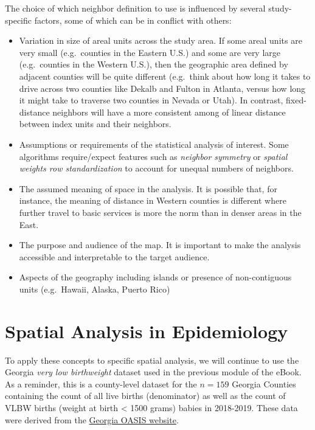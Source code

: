 \documentclass[
]{book}
\providecommand{\tightlist}{%
  \setlength{\itemsep}{0pt}\setlength{\parskip}{0pt}}
\begin{document}
The choice of which neighbor definition to use is influenced by several study-specific factors, some of which can be in conflict with others:

\begin{itemize}
\tightlist
\item
  Variation in size of areal units across the study area. If some areal units are very small (e.g.~counties in the Eastern U.S.) and some are very large (e.g.~counties in the Western U.S.), then the geographic area defined by adjacent counties will be quite different (e.g.~think about how long it takes to drive across two counties like Dekalb and Fulton in Atlanta, versus how long it might take to traverse two counties in Nevada or Utah). In contrast, fixed-distance neighbors will have a more consistent among of linear distance between index units and their neighbors.
\item
  Assumptions or requirements of the statistical analysis of interest. Some algorithms require/expect features such as \emph{neighbor symmetry} or \emph{spatial weights row standardization} to account for unequal numbers of neighbors.
\item
  The assumed meaning of space in the analysis. It is possible that, for instance, the meaning of distance in Western counties is different where further travel to basic services is more the norm than in denser areas in the East.
\item
  The purpose and audience of the map. It is important to make the analysis accessible and interpretable to the target audience.
\item
  Aspects of the geography including islands or presence of non-contiguous units (e.g.~Hawaii, Alaska, Puerto Rico)
\end{itemize}

\hypertarget{spatial-analysis-in-epidemiology-3}{%
\section{Spatial Analysis in Epidemiology}\label{spatial-analysis-in-epidemiology-3}}

To apply these concepts to specific spatial analysis, we will continue to use the Georgia \emph{very low birthweight} dataset used in the previous module of the eBook. As a reminder, this is a county-level dataset for the \(n=159\) Georgia Counties containing the count of all live births (denominator) as well as the count of VLBW births (weight at birth \textless{} 1500 grams) babies in 2018-2019. These data were derived from the \href{https://oasis.state.ga.us/}{Georgia OASIS website}.
\end{document}
